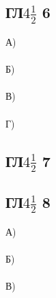 		\subsection{ГЛ$4\frac{1}{2}$ 6}
		А)\\
		\\
		Б)\\
		\\
		В)\\
		\\
		Г)\\
		
		\subsection{ГЛ$4\frac{1}{2}$ 7}
		
		\subsection{ГЛ$4\frac{1}{2}$ 8}
		А)\\
		\\
		Б)\\
		\\
		В)\\
		